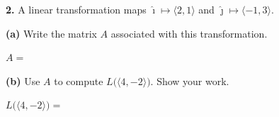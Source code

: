 \documentclass[10pt]{article}
\begin{document}
\begin{notesbox}
\textbf{2.} A linear transformation maps $\hat{\imath}\mapsto\langle2,1\rangle$
and $\hat{\jmath}\mapsto\langle-1,3\rangle$.

\vspace{0.06in}
\textbf{(a)} Write the matrix $A$ associated with this transformation.

\vspace{0.06in}
$A = $ 

\vspace{0.12in}
\textbf{(b)} Use $A$ to compute $L\bigl(\langle4,-2\rangle\bigr)$. Show your work.

\vspace{0.06in}

\vspace{0.04in}
$L\bigl(\langle4,-2\rangle\bigr) = $ 
\end{notesbox}

\vspace{0.10in}
\end{document}
